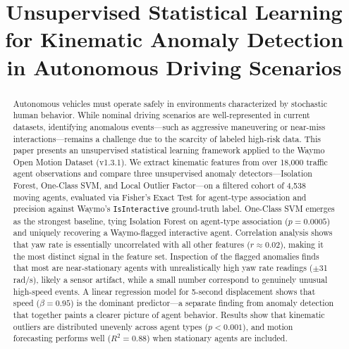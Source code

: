 \documentclass[conference]{IEEEtran}
\begin{document}
\title{Unsupervised Statistical Learning for Kinematic Anomaly Detection in Autonomous Driving Scenarios}

\author{
\and
{}
\and
{}
}

\maketitle

\begin{abstract}
Autonomous vehicles must operate safely in environments characterized by stochastic human behavior. While nominal driving scenarios are well-represented in current datasets, identifying anomalous events---such as aggressive maneuvering or near-miss interactions---remains a challenge due to the scarcity of labeled high-risk data. This paper presents an unsupervised statistical learning framework applied to the Waymo Open Motion Dataset (v1.3.1). We extract kinematic features from over 18{,}000 traffic agent observations and compare three unsupervised anomaly detectors---Isolation Forest, One-Class SVM, and Local Outlier Factor---on a filtered cohort of 4{,}538 moving agents, evaluated via Fisher's Exact Test for agent-type association and precision against Waymo's \texttt{IsInteractive} ground-truth label. One-Class SVM emerges as the strongest baseline, tying Isolation Forest on agent-type association ($p = 0.0005$) and uniquely recovering a Waymo-flagged interactive agent. Correlation analysis shows that yaw rate is essentially uncorrelated with all other features ($r \approx 0.02$), making it the most distinct signal in the feature set. Inspection of the flagged anomalies finds that most are near-stationary agents with unrealistically high yaw rate readings ($\pm$31\,rad/s), likely a sensor artifact, while a small number correspond to genuinely unusual high-speed events. A linear regression model for 5-second displacement shows that speed ($\beta = 0.95$) is the dominant predictor---a separate finding from anomaly detection that together paints a clearer picture of agent behavior. Results show that kinematic outliers are distributed unevenly across agent types ($p < 0.001$), and motion forecasting performs well ($R^2 = 0.88$) when stationary agents are included.
\end{abstract}
\end{document}
